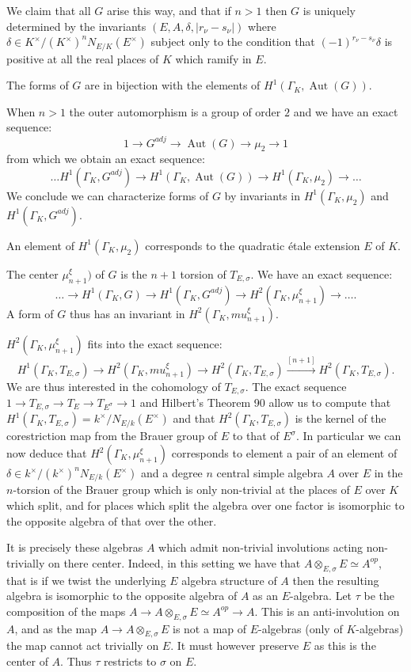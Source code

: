 \documentclass{article}
\theoremstyle{plain}
\theoremstyle{definition}
\DeclareMathOperator{\Aut}{Aut}
\newcommand{\GalKbK}{\Gamma_K}
\begin{document}
We claim that all $G$ arise this way, and that if $n>1$ then $G$ is uniquely determined by the invariants $(E,A,\delta, \left\vert r_\nu-s_\nu\right\vert)$ where $\delta \in K^\times/(K^\times)^nN_{E/K}(E^\times)$ subject only to the condition that $(-1)^{r_\nu-s_\nu}\delta$ is positive at all the real places of $K$ which ramify in $E$.

The forms of $G$ are in bijection with the elements of $H^1(\GalKbK, \Aut(G))$.

When $n>1$ the outer automorphism is a group of order $2$ and we have an exact sequence:
\[ 1 \rightarrow   G^{adj} \rightarrow \Aut(G) \rightarrow \mu_2  \rightarrow 1 \]
from which we obtain an exact sequence:
\[ \ldots  H^1(\GalKbK, G^{adj})  \rightarrow  H^1(\GalKbK, \Aut(G)) \rightarrow  H^1(\GalKbK, \mu_2) \rightarrow \ldots \]
We conclude we can characterize forms of $G$ by invariants in $H^1(\GalKbK, \mu_2)$ and $H^1(\GalKbK, G^{adj})$.

An element of $H^1(\GalKbK, \mu_2)$ corresponds to the quadratic \'etale extension $E$ of $K$.

The center $\mu_{n+1}^\xi)$ of $G$ is the $n+1$ torsion of $T_{E,\sigma}$.
We have an exact sequence:
\[ \ldots \rightarrow H^1(\GalKbK,G) \rightarrow H^1(\GalKbK, G^{adj}) \rightarrow H^2(\GalKbK, \mu_{n+1}^\xi) \rightarrow \ldots. \]
A form of $G$ thus has an invariant in $H^2(\GalKbK, mu_{n+1}^\xi)$.

$H^2(\GalKbK, \mu_{n+1}^\xi)$ fits into the exact sequence:
\[ H^1(\GalKbK, T_{E,\sigma}) \rightarrow H^2(\GalKbK, mu_{n+1}^\xi) \rightarrow H^2(\GalKbK, T_{E,\sigma}) \overset{[n+1]}\rightarrow H^2(\GalKbK, T_{E,\sigma}). \]
We are thus interested in the cohomology of $T_{E,\sigma}$.
The exact sequence $1 \rightarrow T_{E,\sigma} \rightarrow T_E \rightarrow T_{E^\sigma} \rightarrow 1$ and Hilbert's Theorem 90 allow us to compute that 
$H^1(\GalKbK, T_{E,\sigma}) = k^\times/N_{E/k}(E^\times)$ and that $H^2(\GalKbK, T_{E,\sigma})$ is the kernel of the corestriction map from the Brauer group of $E$ to that of $E^\sigma$.
In particular we can now deduce that $H^2(\GalKbK, \mu_{n+1}^\xi)$ corresponds to element a pair of an element of $\delta\in k^\times/(k^\times)^nN_{E/k}(E^\times)$ and a degree $n$ central simple algebra $A$ over $E$ in the $n$-torsion of the Brauer group which is only non-trivial at the places of $E$ over $K$ which split, and for places which split the algebra over one factor is isomorphic to the opposite algebra of that over the other.

It is precisely these algebras $A$ which admit non-trivial involutions acting non-trivially on there center.
Indeed, in this setting we have that $A \otimes_{E,\sigma} E \simeq A^{op}$, that is if we twist the underlying $E$ algebra structure of $A$ then the resulting algebra is isomorphic to the opposite algebra of $A$ as an $E$-algebra. Let $\tau$ be the composition of the maps $A \rightarrow A \otimes_{E,\sigma} E \simeq A^{op} \rightarrow A$. This is an anti-involution on $A$, and as the map $A \rightarrow A \otimes_{E,\sigma} E $ is not a map of $E$-algebras (only of $K$-algebras) the map cannot act trivially on $E$. It must however preserve $E$ as this is the center of $A$. Thus $\tau$ restricts to $\sigma$ on $E$.
\end{document}
